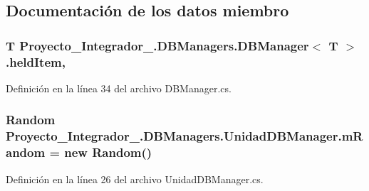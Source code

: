 \subsection{Documentación de los datos miembro}
\hypertarget{class_proyecto___integrador__3_1_1_d_b_managers_1_1_d_b_manager_3_01_t_01_4_a3b67ae3b5b3b9c3793d56c1407d7dcff}{
\subsubsection[{held\-Item}]{\setlength{\rightskip}{0pt plus 5cm}T Proyecto\-\_\-\-Integrador\-\_.\-D\-B\-Managers.\-D\-B\-Manager$<$ T $>$.held\-Item\hspace{0.3cm}{\ttfamily [protected]}, {\ttfamily [inherited]}}}\label{class_proyecto___integrador__3_1_1_d_b_managers_1_1_d_b_manager_3_01_t_01_4_a3b67ae3b5b3b9c3793d56c1407d7dcff}


Definición en la línea 34 del archivo D\-B\-Manager.\-cs.

\hypertarget{class_proyecto___integrador__3_1_1_d_b_managers_1_1_unidad_d_b_manager_a36c1b477b9264ffd517c6d2f736d76f4}{
\subsubsection[{m\-Random}]{\setlength{\rightskip}{0pt plus 5cm}Random Proyecto\-\_\-\-Integrador\-\_.\-D\-B\-Managers.\-Unidad\-D\-B\-Manager.\-m\-Random = new Random()\hspace{0.3cm}{\ttfamily [private]}}}\label{class_proyecto___integrador__3_1_1_d_b_managers_1_1_unidad_d_b_manager_a36c1b477b9264ffd517c6d2f736d76f4}


Definición en la línea 26 del archivo Unidad\-D\-B\-Manager.\-cs.

